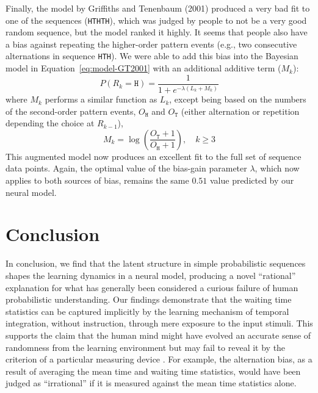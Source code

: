 \documentclass{pnastwo}
\begin{document}
\begin{article}
Finally, the model by Griffiths and Tenenbaum (2001) produced a very bad fit to one of the sequences (\texttt{HTHTH}), which was judged by people to not be a very good random sequence, but the model ranked it highly.
It seems that people also have a bias against repeating the higher-order pattern events (e.g., two consecutive alternations in sequence \texttt{HTH}).
We were able to add this bias into the Bayesian model in Equation~\ref{eq:model-GT2001} with an additional additive term ($M_k$):
\begin{equation}\label{eq:model-augmented}
  P(R_k = \mathtt{H}) = \frac{1}{1+e^{-\lambda (L_k + M_k)}}
\end{equation}
where $M_k$ performs a similar function as $L_k$, except being based on the numbers of the second-order pattern events, $O_{\mathtt{H}}$ and $O_{\mathtt{T}}$ (either alternation or repetition depending the choice at $R_{k-1}$),
\begin{equation}\label{eq:log-likelihood-M}
  M_k = \log \left(\frac{O_{\mathtt{T}} + 1}{O_{\mathtt{H}} + 1} \right), \quad k \geq 3
\end{equation}
This augmented model now produces an excellent fit to the full set of sequence data points.
Again, the optimal value of the bias-gain parameter $\lambda$, which now applies to both sources of bias, remains the same $0.51$ value predicted by our neural model.



\section{Conclusion}
In conclusion, we find that the latent structure in simple probabilistic sequences shapes the learning dynamics in a neural model, producing a novel ``rational'' explanation for what has generally been considered a curious failure of human probabilistic understanding.
Our findings demonstrate that the waiting time statistics can be captured  implicitly by the learning mechanism of temporal integration, without instruction, through mere exposure to the input stimuli.
This supports the claim that the human mind might have evolved an accurate sense of randomness from the learning environment but may fail to reveal it by the criterion of a particular measuring device \cite{Pinker1997}.
For example, the alternation bias, as a result of averaging the mean time and waiting time statistics, would have been judged as ``irrational'' if it is measured against the mean time statistics alone.


\end{article}
\end{document}
